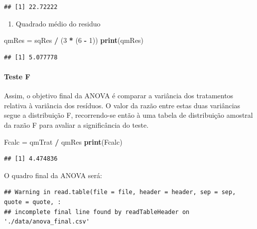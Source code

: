 \documentclass[
]{article}
\newenvironment{Shaded}{\begin{snugshade}}{\end{snugshade}}
\newcommand{\DecValTok}[1]{\textcolor[rgb]{0.00,0.00,0.81}{#1}}
\newcommand{\KeywordTok}[1]{\textcolor[rgb]{0.13,0.29,0.53}{\textbf{#1}}}
\newcommand{\NormalTok}[1]{#1}
\newcommand{\OperatorTok}[1]{\textcolor[rgb]{0.81,0.36,0.00}{\textbf{#1}}}
\newcommand{\StringTok}[1]{\textcolor[rgb]{0.31,0.60,0.02}{#1}}
\providecommand{\tightlist}{%
  \setlength{\itemsep}{0pt}\setlength{\parskip}{0pt}}
\begin{document}
\begin{verbatim}
## [1] 22.72222
\end{verbatim}

\begin{enumerate}
\def\labelenumi{\arabic{enumi}.}
\setcounter{enumi}{1}
\tightlist
\item
  Quadrado médio do residuo
\end{enumerate}

\begin{Shaded}
\begin{Highlighting}[]
\NormalTok{qmRes =}\StringTok{ }\NormalTok{sqRes }\OperatorTok{/}\StringTok{ }\NormalTok{(}\DecValTok{3} \OperatorTok{*}\StringTok{ }\NormalTok{(}\DecValTok{6} \OperatorTok{-}\StringTok{ }\DecValTok{1}\NormalTok{))}
\KeywordTok{print}\NormalTok{(qmRes)}
\end{Highlighting}
\end{Shaded}

\begin{verbatim}
## [1] 5.077778
\end{verbatim}

\hypertarget{teste-f}{%
\paragraph{Teste F}\label{teste-f}}

Assim, o objetivo final da ANOVA é comparar a variância dos tratamentos relativa à variância dos resíduos. O valor da razão entre estas duas variâncias segue a distribuição F, recorrendo-se então à uma tabela de distribuição amostral da razão F para avaliar a significância do teste.

\begin{Shaded}
\begin{Highlighting}[]
\NormalTok{Fcalc =}\StringTok{ }\NormalTok{qmTrat }\OperatorTok{/}\StringTok{ }\NormalTok{qmRes}
\KeywordTok{print}\NormalTok{(Fcalc)}
\end{Highlighting}
\end{Shaded}

\begin{verbatim}
## [1] 4.474836
\end{verbatim}

O quadro final da ANOVA será:

\begin{verbatim}
## Warning in read.table(file = file, header = header, sep = sep, quote = quote, :
## incomplete final line found by readTableHeader on './data/anova_final.csv'
\end{verbatim}
\end{document}
